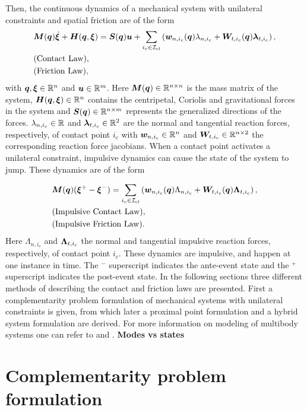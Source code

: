 \documentclass[../DC2017114Bouma.tex]{subfiles}
\begin{document}
Then, the continuous dynamics of a mechanical system with unilateral constraints and spatial friction are of the form
\begin{align}
&{\boldsymbol{M}}({\boldsymbol{q}})\dot{\boldsymbol{\xi}} + {\boldsymbol{H}}({\boldsymbol{q}},\boldsymbol{\xi}) = {\boldsymbol{S}}({\boldsymbol{q}}){\boldsymbol{u}} + \sum_{i_c\in\mathcal{I}_{\text{cl}}}\left({\boldsymbol{w}}_{n,i_c}({\boldsymbol{q}})\lambda_{n,i_c} + {\boldsymbol{W}}_{t,i_c}({\boldsymbol{q}})\boldsymbol{\lambda}_{t,i_c} \right), \label{eq:appcont1}\\
&\text{(Contact Law)},\label{eq:appcont2}\\
&\text{(Friction Law)},\label{eq:appcont3}
\end{align}
with ${\boldsymbol{q}},\boldsymbol{\xi}\in\mathbb{R}^{n}$ and ${\boldsymbol{u}}\in\mathbb{R}^m$. Here ${\boldsymbol{M}}({\boldsymbol{q}})\in\mathbb{R}^{n\times n}$ is the mass matrix of the system, ${\boldsymbol{H}}({\boldsymbol{q}},\boldsymbol{\xi})\in\mathbb{R}^{n}$ contains the centripetal, Coriolis and gravitational forces in the system and ${\boldsymbol{S}}({\boldsymbol{q}})\in\mathbb{R}^{n\times m}$ represents the generalized directions of the forces. $\lambda_{n,i_c}\in\mathbb{R}$ and $\boldsymbol{\lambda}_{t,i_c}\in\mathbb{R}^{2}$ are the normal and tangential reaction forces, respectively, of contact point $i_c$ with ${\boldsymbol{w}}_{n,i_c}\in\mathbb{R}^{n}$ and ${\boldsymbol{W}}_{t,i_c}\in\mathbb{R}^{n\times 2}$ the corresponding reaction force jacobians. When a contact point activates a unilateral constraint, impulsive dynamics can cause the state of the system to jump. These dynamics are of the form

\begin{align}
&{\boldsymbol{M}}({\boldsymbol{q}})(\boldsymbol{\xi}^+ - \boldsymbol{\xi}^-) = \sum_{i_c\in\mathcal{I}_{\text{cl}}}\left( {\boldsymbol{w}}_{n,i_c}({\boldsymbol{q}})\Lambda_{n,i_c} + {\boldsymbol{W}}_{t,i_c}({\boldsymbol{q}})\boldsymbol{\Lambda}_{t,i_c}\right), \label{eq:appimp1}\\
&\text{(Impulsive Contact Law)},\label{eq:appimp2}\\
&\text{(Impulsive Friction Law)}.\label{eq:appimp3}
\end{align}
Here $\Lambda_{n,i_c}$ and $\boldsymbol{\Lambda}_{t,i_c}$ the normal and tangential impulsive reaction forces, respectively, of contact point $i_c$. These dynamics are impulsive, and happen at one instance in time. The $^-$ superscript indicates the ante-event state and the $^+$ superscript indicates the post-event state. In the following sections three different methods of describing the contact and friction laws are presented. First a complementarity problem formulation of mechanical systems with unilateral constraints is given, from which later a proximal point formulation and a hybrid system formulation are derived. For more information on modeling of multibody systems one can refer to \cite{Leine2008} and \cite{Wouw2016}. \textbf{Modes vs states}

\section{Complementarity problem formulation}\label{sec:comp}
\end{document}
